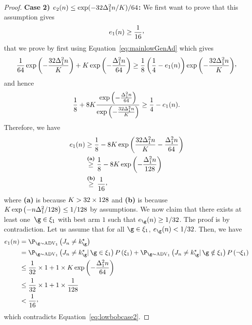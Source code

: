 \begin{proof}
		\smallskip	
	\noindent\textbf{Case 2) $e_{2}(n)\leq
	\exp(-32\Delta^2_{1}n/K)/64$:}
We first want to prove that this assumption gives
	\begin{equation}\label{eq:lowbobcase2}
\ProErr_{1}(\timeHorizon)\geq \frac{1}{16}\CommaBin
	\end{equation}
	that we prove by first using Equation~\ref{eq:mainlowGenAd} which gives
	\[
		\frac{1}{64}\exp\left(-\frac{32\gap^2_{1}\timeHorizon}{\nArms}\right)
		+
		\nArms\exp\left(-\frac{\gap^2_1\timeHorizon}{64}\right)
		\geq
		\frac{1}{8}\left(\frac{1}{4}-\ProErr_{1}(\timeHorizon) 
		\right)\exp\left(-\frac{32\gap^2_{1}\timeHorizon}{\nArms}\right)\!\CommaBin
	\]
and hence
	\[
\frac{1}{8}
+
8K\frac{\exp\left(-\frac{\Delta^2_1n}{64}\right)}
{\exp\left(-\frac{32\Delta^2_{1}n}{K}\right)}
\geq
\frac{1}{4}-e_{1}(n). 
\]
Therefore, we have 	
	\begin{align*}
\ProErr_{1}(\timeHorizon) 
&\geq
\frac{1}{8}
-
8\nArms\exp\left(\frac{32\gap^2_{1}\timeHorizon}{\nArms}-\frac{\gap^2_1\timeHorizon}{64}\right)\\
&\stackrel{\textbf{(a)}}{\geq}
\frac{1}{8}
-
8\nArms\exp\left(-\frac{\gap^2_1\timeHorizon}{128}\right)\\
&\stackrel{\textbf{(b)}}{\geq}
\frac{1}{16}\CommaBin
\end{align*}
%
where \textbf{(a)} is 
	because $K>32\times128$ and
	\textbf{{(b)}} is because $K\exp\left( -n\Delta^2_1 /128\right)\leq 1/128$ by assumptions.	
	We now claim that there exists at least one~$\gainVector\in\eventc_1$   
	with best arm $1$  such that 
	$\ProErr_{\gainVector}(\timeHorizon)\geq 1/32$. 
	The proof is by contradiction. Let us assume that for all $\gainVector\in\eventc_1$, $\ProErr_{\gainVector}(\timeHorizon)< 1/32$. 
	Then, we have 
	\begin{align*}
\ProErr_{1}(\timeHorizon)
	&=
	\Pro_{\gainVector\sim\advPro_1}\left(\recomArm_n \neq 
	\bestArm_{\gainVector}\right)\\
	&=
	\Pro_{\gainVector\sim\advPro_1}\left(\recomArm_n \neq 
	\bestArm_{\gainVector}|\,\gainVector\in\eventc_1\right)
	P\left(\eventc_1\right)
	+
	\Pro_{\gainVector\sim\advPro_1}\left(\recomArm_n \neq 
	\bestArm_{\gainVector}|\,\gainVector\notin\eventc_1\right)
	P\left(\neg\eventc_1\right)\\
	&\leq
\frac{1}{32}
	\times 1
	+
	1\times
	\nArms\exp\left(-\frac{\gap^2_1\timeHorizon}{64}\right)\\
	&\leq
	\frac{1}{32}
	\times 1
	+
	1\times
	\frac{1}{128}\\
	&<
	\frac{1}{16}\CommaBin
\end{align*} which contradicts Equation~\ref{eq:lowbobcase2}.
%
\end{proof}%